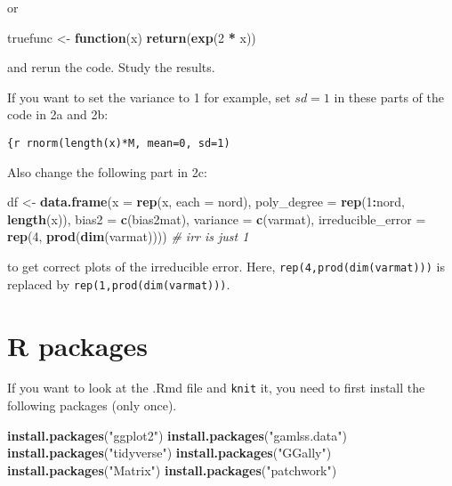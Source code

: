\documentclass[
]{article}
\newenvironment{Shaded}{\begin{snugshade}}{\end{snugshade}}
\newcommand{\AttributeTok}[1]{\textcolor[rgb]{0.13,0.29,0.53}{#1}}
\newcommand{\CommentTok}[1]{\textcolor[rgb]{0.56,0.35,0.01}{\textit{#1}}}
\newcommand{\ControlFlowTok}[1]{\textcolor[rgb]{0.13,0.29,0.53}{\textbf{#1}}}
\newcommand{\DecValTok}[1]{\textcolor[rgb]{0.00,0.00,0.81}{#1}}
\newcommand{\FunctionTok}[1]{\textcolor[rgb]{0.13,0.29,0.53}{\textbf{#1}}}
\newcommand{\NormalTok}[1]{#1}
\newcommand{\OtherTok}[1]{\textcolor[rgb]{0.56,0.35,0.01}{#1}}
\newcommand{\SpecialCharTok}[1]{\textcolor[rgb]{0.81,0.36,0.00}{\textbf{#1}}}
\newcommand{\StringTok}[1]{\textcolor[rgb]{0.31,0.60,0.02}{#1}}
\begin{document}
or

\begin{Shaded}
\begin{Highlighting}[]
\NormalTok{truefunc }\OtherTok{\textless{}{-}} \ControlFlowTok{function}\NormalTok{(x) }\FunctionTok{return}\NormalTok{(}\FunctionTok{exp}\NormalTok{(}\DecValTok{2} \SpecialCharTok{*}\NormalTok{ x))}
\end{Highlighting}
\end{Shaded}

and rerun the code. Study the results.

If you want to set the variance to 1 for example, set \(sd=1\) in these
parts of the code in 2a and 2b:

\texttt{\{r\ rnorm(length(x)*M,\ mean=0,\ sd=1)}

Also change the following part in 2c:

\begin{Shaded}
\begin{Highlighting}[]
\NormalTok{df }\OtherTok{\textless{}{-}} \FunctionTok{data.frame}\NormalTok{(}\AttributeTok{x =} \FunctionTok{rep}\NormalTok{(x, }\AttributeTok{each =}\NormalTok{ nord), }\AttributeTok{poly\_degree =} \FunctionTok{rep}\NormalTok{(}\DecValTok{1}\SpecialCharTok{:}\NormalTok{nord, }\FunctionTok{length}\NormalTok{(x)), }
                 \AttributeTok{bias2 =} \FunctionTok{c}\NormalTok{(bias2mat), }\AttributeTok{variance =} \FunctionTok{c}\NormalTok{(varmat), }
                 \AttributeTok{irreducible\_error =} \FunctionTok{rep}\NormalTok{(}\DecValTok{4}\NormalTok{, }\FunctionTok{prod}\NormalTok{(}\FunctionTok{dim}\NormalTok{(varmat)))) }\CommentTok{\# irr is just 1}
\end{Highlighting}
\end{Shaded}

to get correct plots of the irreducible error. Here,
\texttt{rep(4,prod(dim(varmat)))} is replaced by
\texttt{rep(1,prod(dim(varmat)))}.

\hypertarget{r-packages}{%
\section{\texorpdfstring{ R packages}{ R packages}}\label{r-packages}}

If you want to look at the .Rmd file and \texttt{knit} it, you need to
first install the following packages (only once).

\begin{Shaded}
\begin{Highlighting}[]
\FunctionTok{install.packages}\NormalTok{(}\StringTok{"ggplot2"}\NormalTok{)}
\FunctionTok{install.packages}\NormalTok{(}\StringTok{"gamlss.data"}\NormalTok{)}
\FunctionTok{install.packages}\NormalTok{(}\StringTok{"tidyverse"}\NormalTok{)}
\FunctionTok{install.packages}\NormalTok{(}\StringTok{"GGally"}\NormalTok{)}
\FunctionTok{install.packages}\NormalTok{(}\StringTok{"Matrix"}\NormalTok{)}
\FunctionTok{install.packages}\NormalTok{(}\StringTok{"patchwork"}\NormalTok{)}
\end{Highlighting}
\end{Shaded}
\end{document}
